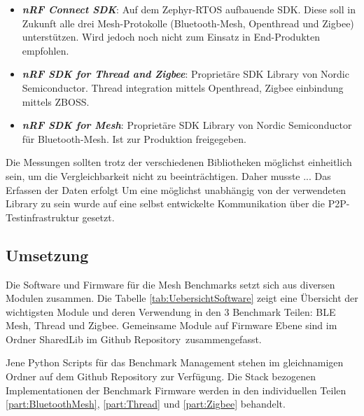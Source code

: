 \begin{itemize}
	\item \textit{\textbf{nRF Connect SDK}}: Auf dem Zephyr-RTOS aufbauende SDK. Diese soll in Zukunft alle drei Mesh-Protokolle (Bluetooth-Mesh, Openthread und Zigbee) unterstützen. Wird jedoch noch nicht zum Einsatz in End-Produkten empfohlen. \cite{nordic_semi_welcome_to_the_nrf_connect_sdk_2020}
	\item \textit{\textbf{nRF SDK for Thread and Zigbee}}: Proprietäre SDK Library von Nordic Semiconductor. Thread integration mittels Openthread, Zigbee einbindung mittels ZBOSS. \cite{nordic_semi_nrf_sdk_for_thread_and_zigbee_2020}
	\item \textit{\textbf{nRF SDK for Mesh}}: Proprietäre SDK Library von Nordic Semiconductor für Bluetooth-Mesh. Ist zur Produktion freigegeben. \cite{nordic_semi_nrf_sdk_for_mesh_2020}
\end{itemize}

Die Messungen sollten trotz der verschiedenen Bibliotheken möglichst einheitlich sein, um die Vergleichbarkeit nicht zu beeinträchtigen. Daher musste ... Das Erfassen der Daten erfolgt Um eine möglichst unabhängig von der verwendeten Library zu sein wurde auf eine selbst entwickelte Kommunikation über die P2P-Testinfrastruktur gesetzt. 






\subsection{Umsetzung}\label{subsec:Software_Umsetzung}



Die Software und Firmware für die Mesh Benchmarks setzt sich aus diversen Modulen zusammen. Die Tabelle \ref{tab:UebersichtSoftware} zeigt eine Übersicht der wichtigsten Module und deren Verwendung in den 3 Benchmark Teilen: BLE Mesh, Thread und Zigbee.
Gemeinsame Module auf Firmware Ebene sind im Ordner SharedLib im Github Repository\footnotemark\ zusammengefasst.

Jene Python Scripts für das Benchmark Management stehen im gleichnamigen Ordner auf dem Github Repository zur Verfügung.
Die Stack bezogenen Implementationen der Benchmark Firmware werden in den individuellen Teilen \ref{part:BluetoothMesh}, \ref{part:Thread} und \ref{part:Zigbee} behandelt.


